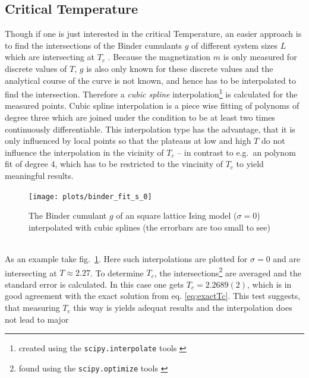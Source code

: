 \subsection{Critical Temperature}
\label{ssec:binderIntersections}
    Though if one is just interested in the critical Temperature, an
    easier approach is to find the intersections of the Binder cumulants
    \(g\) of different system sizes \(L\) which are intersecting at
    \(T_c\) \cite{Binder1981}.
    Because the magnetization \(m\) is only measured for discrete values
    of \(T\), \(g\) is also only known for these discrete values and the
    analytical course of the curve is not known, and hence has
    to be interpolated to find the intersection. Therefore a \emph{cubic spline}
    interpolation\footnote{created using the \texttt{scipy.interpolate} tools \cite{scipy2001}}
    is calculated for the measured points.
    Cubic spline interpolation is a piece wise fitting of polynoms of
    degree three which are joined under the condition to be at least two
    times continuously differentiable. This interpolation type has the
    advantage, that it is only influenced by local points so that the
    plateaus at low and high \(T\) do not influence the interpolation in
    the vicinity of \(T_c\) -- in contrast to e.g.\ an polynom fit of
    degree 4, which has to be restricted to the vincinity of \(T_c\) to
    yield meaningful results.
    \begin{figure}[htbp]
        \centering
        \texttt{[image: plots/binder\_fit\_s\_0]}
        \caption[Example of a Binder Cumulant to Determine the Critical Temperature]
        {
            The Binder cumulant \(g\) of an square lattice Ising model
            (\(\sigma=0\)) interpolated with cubic splines
            (the errorbars are too small to see)\\
        }
        \label{fig:gettingCrit:binder_fit_s_0}
    \end{figure}\\
    As an example take fig.\ \ref{fig:gettingCrit:binder_fit_s_0}.
    Here such interpolations are plotted for \(\sigma=0\) and are
    intersecting at \(T \approx 2.27\).
    To determine \(T_c\), the intersections\footnote{found using the \texttt{scipy.optimize} tools \cite{scipy2001}}
    are averaged and the standard error is calculated. In this case one
    gets \(T_c = 2.2689(2)\), which is in good agreement with the
    exact solution from eq. \eqref{eq:exactTc}.
    This test suggests, that measuring \(T_c\) this way is yields
    adequat results and the interpolation does not lead to major
